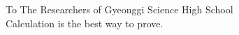 \begin{dedication}
{\large{To The Researchers of Gyeonggi Science High School}}\\[5mm]
Calculation is the best way to prove.
\end{dedication}

